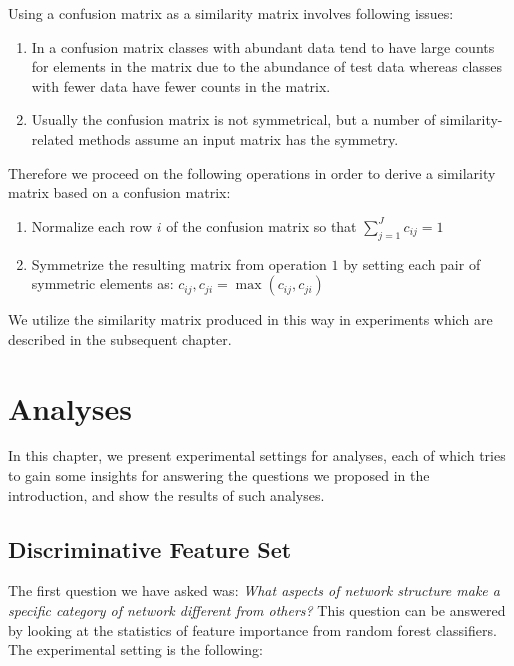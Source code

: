 \documentclass{article}
\begin{document}
Using a confusion matrix as a similarity matrix involves following issues:
\begin{enumerate}
	\item In a confusion matrix classes with abundant data tend to have large counts for elements in the matrix due to the abundance of test data whereas classes with fewer data have fewer counts in the matrix.
	\item Usually the confusion matrix is not symmetrical, but a number of similarity-related methods assume an input matrix has the symmetry.
\end{enumerate}

Therefore we proceed on the following operations in order to derive a similarity matrix based on a confusion matrix:
\begin{enumerate}
	\item Normalize each row $i$ of the confusion matrix so that $\sum_{j=1}^J c_{ij} = 1$
	\item Symmetrize the resulting matrix from operation $1$ by setting each pair of symmetric elements as: $c_{ij},c_{ji} = \max (c_{ij},c_{ji})$
\end{enumerate}

We utilize the similarity matrix produced in this way in experiments which are described in the subsequent chapter.
		
\section{Analyses}
In this chapter, we present experimental settings for analyses, each of which tries to gain some insights for answering the questions we proposed in the introduction, and show the results of such analyses.
\subsection{Discriminative Feature Set}
The first question we have asked was: \textit{What aspects of network structure make a specific category of network different from others?} This question can be answered by looking at the statistics of feature importance from random forest classifiers. The experimental setting is the following: 
\end{document}
